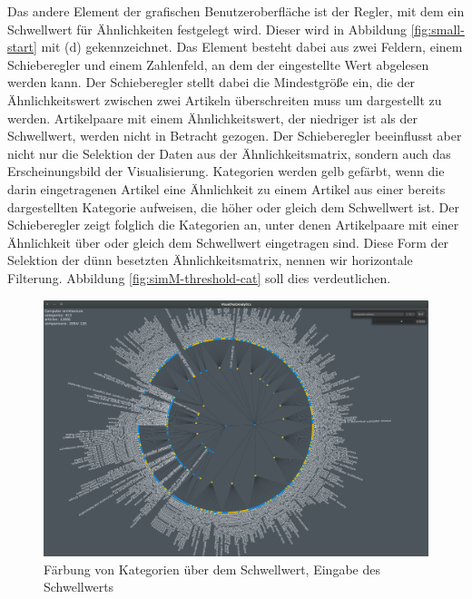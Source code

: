 Das andere Element der grafischen Benutzeroberfläche ist der Regler, mit dem ein Schwellwert für Ähnlichkeiten festgelegt wird.
Dieser wird in Abbildung \ref{fig:small-start} mit (d) gekennzeichnet.
Das Element besteht dabei aus zwei Feldern, einem Schieberegler und einem Zahlenfeld, an dem der eingestellte Wert abgelesen werden kann.
Der Schieberegler stellt dabei die Mindestgröße ein, die der Ähnlichkeitswert zwischen zwei Artikeln überschreiten muss um dargestellt zu werden.
Artikelpaare mit einem Ähnlichkeitswert, der niedriger ist als der Schwellwert, werden nicht in Betracht gezogen.
Der Schieberegler beeinflusst aber nicht nur die Selektion der Daten aus der Ähnlichkeitsmatrix, sondern auch das Erscheinungsbild der Visualisierung.
Kategorien werden gelb gefärbt, wenn die darin eingetragenen Artikel eine Ähnlichkeit zu einem Artikel aus einer bereits dargestellten Kategorie aufweisen, die höher oder gleich dem Schwellwert ist.
Der Schieberegler zeigt folglich die Kategorien an, unter denen Artikelpaare mit einer Ähnlichkeit über oder gleich dem Schwellwert eingetragen sind.
Diese Form der Selektion der dünn besetzten Ähnlichkeitsmatrix, nennen wir horizontale Filterung.
Abbildung \ref{fig:simM-threshold-cat} soll dies verdeutlichen.
\begin{figure}
    \centering
    \includegraphics[width=\textwidth]{images/threshold-7033-lvl3}
    \caption{Färbung von Kategorien über dem Schwellwert, Eingabe des Schwellwerts}
    \label{fig:threshold-cat}
\end{figure}


